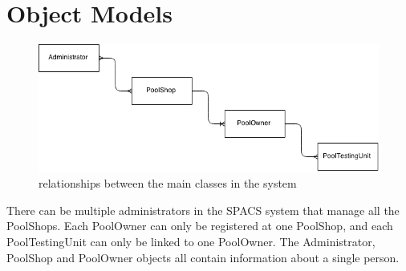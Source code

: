 \section{Object Models}


\begin{figure}[h!]
\begin{center}
	\includegraphics[width=15cm]{images/ObjectRelations}
	\caption{relationships between the main classes in the system}
\end{center}
\end{figure}

\par
There can be multiple administrators in the SPACS system that manage all the PoolShops. Each PoolOwner can only be registered at one PoolShop, and each PoolTestingUnit can only be linked to one PoolOwner. The Administrator, PoolShop and PoolOwner objects all contain information about a single person.
